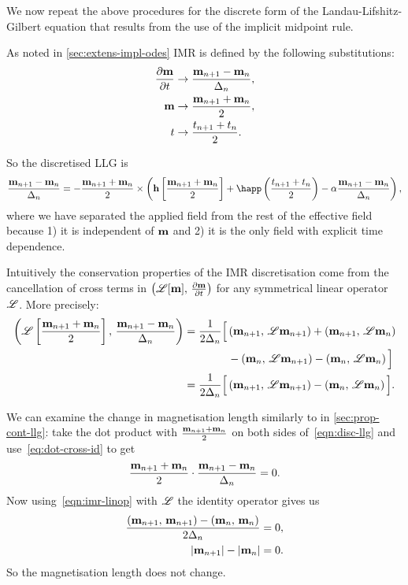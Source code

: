 We now repeat the above procedures for the discrete form of the Landau-Lifshitz-Gilbert equation that results from the use of the implicit midpoint rule.

As noted in \autoref{sec:extens-impl-odes} IMR is defined by the following substitutions:
\begin{align}
  \label{eq:55}
  \frac{\partial \mathbf{m}}{\partial t} &\rightarrow \frac{\mathbf{m}_{n+1} - \mathbf{m}_n}{\Delta_{n}}, \\
  \mathbf{m} &\rightarrow \frac{\mathbf{m}_{n+1} + \mathbf{m}_n}{2}, \\
  t &\rightarrow \frac{t_{n+1} + t_n}{2}.
\end{align}

So the discretised LLG is
\begin{equation}
  \frac{\mv_{n+1} - \mv_n}{\dtn} = - \frac{\mv_{n+1} + \mv_n}{2} \times
  \left(
  \hv \left[\frac{\mv_{n+1} + \mv_n}{2} \right]
  + \happ\left(\frac{t_{n+1} + t_n}{2}\right)
  - \dampc \frac{\mv_{n+1} - \mv_n}{\dtn}
  \right),
  \label{eqn:disc-llg}
\end{equation}
where we have separated the applied field from the rest of the effective field because 1) it is independent of $\mathbf{m}$ and 2) it is the only field with explicit time dependence.

Intuitively the conservation properties of the IMR discretisation come from the cancellation of cross terms in $\left(\mathscr{L}[\mathbf{m}],\, \frac{\partial \mathbf{m}}{\partial t} \right)$ for any symmetrical linear operator $\mathscr{L}$. More precisely:
\begin{equation}
  \begin{aligned}
    \label{eqn:imr-linop}
    \left(\mathscr{L} \left[ \frac{\mathbf{m}_{n+1} + \mathbf{m}_n}{2} \right],\,  \frac{\mathbf{m}_{n+1} - \mathbf{m}_n}{\Delta_{n}}  \right)
    &= \frac{1}{2\Delta_{n}} \Big[
      \left(\mathbf{m}_{n+1},\, \mathscr{L} \mathbf{m}_{n+1} \right) + \left(\mathbf{m}_{n+1},\, \mathscr{L} \mathbf{m}_{n} \right) \\
      & \qquad\qquad - \left(\mathbf{m}_{n},\, \mathscr{L} \mathbf{m}_{n+1} \right) - \left(\mathbf{m}_{n},\, \mathscr{L} \mathbf{m}_{n} \right)
      \Big] \\
    &= \frac{1}{2\Delta_{n}} \Big[
      \left(\mathbf{m}_{n+1},\, \mathscr{L} \mathbf{m}_{n+1} \right)
      - \left(\mathbf{m}_{n},\, \mathscr{L} \mathbf{m}_{n} \right)
      \Big].
  \end{aligned}
\end{equation}

We can examine the change in magnetisation length similarly to in \autoref{sec:prop-cont-llg}: take the dot product with $\frac{\mathbf{m}_{n+1} + \mathbf{m}_n}{2}$ on both sides of~\eqref{eqn:disc-llg} and use~\eqref{eq:dot-cross-id} to get
\begin{equation}
  \frac{\mathbf{m}_{n+1} + \mathbf{m}_n}{2} \cdot \frac{\mathbf{m}_{n+1} - \mathbf{m}_n}{\Delta_{n}} = 0.
\end{equation}
Now using~\eqref{eqn:imr-linop} with $\mathscr{L}$ the identity operator gives us
\begin{equation}
  \begin{aligned}
    \frac{\left(\mathbf{m}_{n+1},\, \mathbf{m}_{n+1} \right) - \left(\mathbf{m}_n,\, \mathbf{m}_n \right) }{2 \Delta_{n}} &= 0, \\
    \left|{\mathbf{m}_{n+1}} \right| - \left|{\mathbf{m}_n} \right| &= 0.
  \end{aligned}
\end{equation}
So the magnetisation length does not change.

